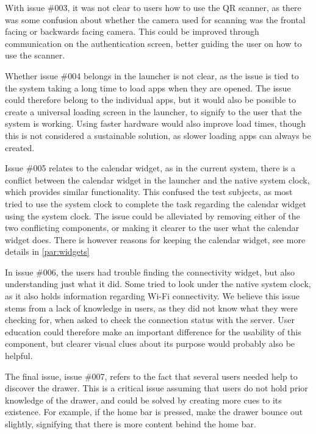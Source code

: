 With issue \#{}003, it was not clear to users how to use the QR scanner, as there was some confusion about whether the camera used for scanning was the frontal facing or backwards facing camera. 
This could be improved through communication on the authentication screen, better guiding the user on how to use the scanner. \newline

Whether issue \#{}004 belongs in the launcher is not clear, as the issue is tied to the system taking a long time to load apps when they are opened. 
The issue could therefore belong to the individual apps, but it would also be possible to create a universal loading screen in the launcher, to signify to the user that the system is working. 
Using faster hardware would also improve load times, though this is not considered a sustainable solution, as slower loading apps can always be created. \newline

Issue \#{}005 relates to the calendar widget, as in the current system, there is a conflict between the calendar widget in the \giraf[] launcher and the native system clock, which provides similar functionality. 
This confused the test subjects, as most tried to use the system clock to complete the task regarding the calendar widget using the system clock. 
The issue could be alleviated by removing either of the two conflicting components, or making it clearer to the user what the calendar widget does. 
There is however reasons for keeping the calendar widget, see more details in \autoref{par:widgets} \newline

In issue \#{}006, the users had trouble finding the connectivity widget, but also understanding just what it did. 
Some tried to look under the native system clock, as it also holds information regarding Wi-Fi connectivity. 
We believe this issue stems from a lack of knowledge in users, as they did not know what they were checking for, when asked to check the connection status with the server. 
User education could therefore make an important difference for the usability of this component, but clearer visual clues about its purpose would probably also be helpful. \newline

The final issue, issue \#{}007, refers to the fact that several users needed help to discover the drawer. 
This is a critical issue assuming that users do not hold prior knowledge of the drawer, and could be solved by creating more cues to its existence. 
For example, if the home bar is pressed, make the drawer bounce out slightly, signifying that there is more content behind the home bar. 

